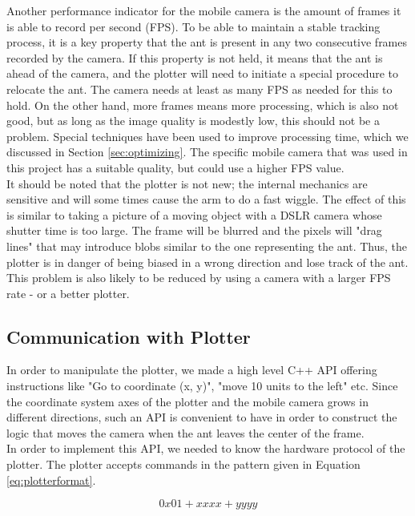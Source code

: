 Another performance indicator for the mobile camera is the amount of frames it is able to record per second (FPS). To be able to maintain a stable tracking process, it is a key property that the ant is present in any two consecutive frames recorded by the camera. If this property is not held, it means that the ant is ahead of the camera, and the plotter will need to initiate a special procedure to relocate the ant. The camera needs at least as many FPS as needed for this to hold. On the other hand, more frames means more processing, which is also not good, but as long as the image quality is modestly low, this should not be a problem. Special techniques have been used to improve processing time, which we discussed in Section \ref{sec:optimizing}. The specific mobile camera that was used in this project has a suitable quality, but could use a higher FPS value. \\

It should be noted that the plotter is not new; the internal mechanics are sensitive and will some times cause the arm to do a fast wiggle. The effect of this is similar to taking a picture of a moving object with a DSLR camera whose shutter time is too large. The frame will be blurred and the pixels will "drag lines" that may introduce blobs similar to the one representing the ant. Thus, the plotter is in danger of being biased in a wrong direction and lose track of the ant. This problem is also likely to be reduced by using a camera with a larger FPS rate - or a better plotter. \\

\subsection{Communication with Plotter}
In order to manipulate the plotter, we made a high level C++ API offering instructions like "Go to coordinate (x, y)", "move 10 units to the left" etc. Since the coordinate system axes of the plotter and the mobile camera grows in different directions, such an API is convenient to have in order to construct the logic that moves the camera when the ant leaves the center of the frame. \\

In order to implement this API, we needed to know the hardware protocol of the plotter. The plotter accepts commands in the pattern given in Equation \ref{eq:plotterformat}.

\begin{center}
  \begin{equation}
  \label{eq:plotterformat}
    0x01 +  xxxx +  yyyy
  \end{equation}
\end{center}

